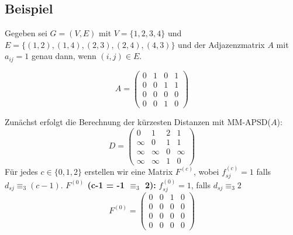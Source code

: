 \documentclass{scrartcl}
\numberwithin{equation}{section}
\begin{document}
\subsection{Beispiel}
Gegeben sei $G = (V, E)$ mit $V = \{1, 2, 3, 4\}$ und $E = \{(1, 2), (1, 4), (2, 3), (2, 4), (4, 3)\}$ und der Adjazenzmatrix $A$ mit $a_{ij} = 1$ genau dann, wenn $(i,j) \in E$.\newline
\begin{minipage}[t]{0.45\textwidth}
	\centering
	\vspace{0.01cm} %
\end{minipage}%
\hfill
\begin{minipage}[t]{0.45\textwidth}
	\centering
	$$A = \begin{pmatrix}
		0 & 1 & 0 & 1 \\
		0 & 0 & 1 & 1 \\
		0 & 0 & 0 & 0 \\
		0 & 0 & 1 & 0
	\end{pmatrix}$$
\end{minipage}
\newline
\newline
\newline
Zunächst erfolgt die Berechnung der kürzesten Distanzen mit MM-APSD($A$):
$$D = \begin{pmatrix}
	0 & 1 & 2 & 1 \\
	\infty & 0 & 1 & 1 \\
	\infty & \infty & 0 & \infty \\
	\infty & \infty & 1 & 0
\end{pmatrix}$$
Für jedes $c \in \{0, 1, 2\}$ erstellen wir eine Matrix $F^{(c)}$, wobei $f_{sj}^{(c)} = 1$ falls $d_{sj} \equiv_3 (c-1)$.
\textbf{$F^{(0)}$ (c-1 = -1 $\equiv_3$ 2):} $f_{sj}^{(0)} = 1$, falls $d_{sj} \equiv_3 2$
$$F^{(0)} = \begin{pmatrix}
	0 & 0 & 1 & 0 \\
	0 & 0 & 0 & 0 \\
	0 & 0 & 0 & 0 \\
	0 & 0 & 0 & 0
\end{pmatrix}$$
\end{document}
